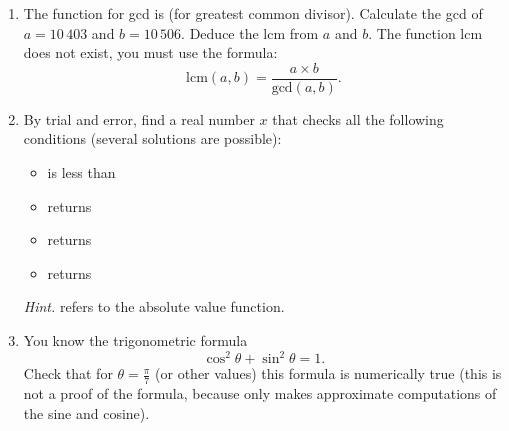 \documentclass[11pt,class=report,crop=false]{standalone}
\begin{document}
\begin{activite}


\begin{enumerate}
  \item The \Python{} function for gcd is  (for greatest common divisor). Calculate the gcd of $a = 10\,403$ and $b = 10\,506$. Deduce the lcm from $a$ and $b$. The function lcm does not exist, you must use the formula:
  $$\text{lcm}(a,b) = \frac{a \times b}{\text{gcd}(a,b)}.$$
  
  \item By trial and error, find a real number $x$ that checks all the following conditions (several solutions are possible):
  \begin{itemize}
    \item {} is less than 
    \item {} returns 
    \item {} returns 
    \item {} returns  
  \end{itemize}
 
  \emph{Hint.}  refers to the absolute value function.
  
  \item You know the trigonometric formula 
  $$\cos^2 \theta + \sin^2 \theta = 1.$$
  Check that for $\theta = \frac\pi7$ (or other values) this formula is numerically true (this is not a proof of the formula, because \Python{} only makes approximate computations of the sine and cosine).
\end{enumerate}  
\end{activite}


\end{document}
